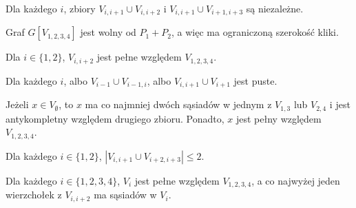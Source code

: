 \documentclass[polish]{beamer}
\begin{document}
\begin{frame}
    \begin{theorem}
        \renewcommand{\qedsymbol}{}
        Dla każdego $i$, zbiory $V_{i,i+1} \cup V_{i,i+2}$ i $V_{i,i+1} \cup V_{i+1,i+3}$ są niezależne.
    \end{theorem}
    \graphSmaller
\end{frame}

\begin{frame}
    \begin{theorem}
        \renewcommand{\qedsymbol}{}
        Graf $G[V_{1,2,3,4}]$ jest wolny od $P_1 + P_2$, a więc ma ograniczoną szerokość kliki.
        \end{theorem}
    \graphSmaller
\end{frame}

\begin{frame}
    \begin{theorem}
        \renewcommand{\qedsymbol}{}
        Dla $i \in \{1,2\}$, $V_{i,i+2}$ jest pełne względem $V_{1,2,3,4}$.
    \end{theorem}
    \graphSmaller
\end{frame}

\begin{frame}
    \begin{theorem}
        \renewcommand{\qedsymbol}{}
        Dla każdego $i$, albo $V_{i-1} \cup V_{i-1,i}$, albo $V_{i,i+1} \cup V_{i+1}$ jest puste.
    \end{theorem}
    \graphSmaller
\end{frame}

\begin{frame}
    \begin{theorem}
        \renewcommand{\qedsymbol}{}
        Jeżeli $x \in V_\emptyset$, to $x$ ma co najmniej dwóch sąsiadów w jednym z $V_{1,3}$ lub $V_{2,4}$ i jest antykompletny względem drugiego zbioru. Ponadto, $x$ jest pełny względem $V_{1,2,3,4}$.
    \end{theorem}
    \graphSmaller
\end{frame}

\begin{frame}
    \begin{theorem}
        \renewcommand{\qedsymbol}{}
        Dla każdego $i \in \{1, 2\}$, $|V_{i,i+1} \cup V_{i+2,i+3}| \leq 2$.
    \end{theorem}
    \graphSmaller
\end{frame}

\begin{frame}
    \begin{theorem}
        \renewcommand{\qedsymbol}{}
        Dla każdego $i \in \{1, 2, 3, 4\}$, $V_i$ jest pełne względem $V_{1,2,3,4}$, a co najwyżej jeden wierzchołek z $V_{i,i+2}$ ma sąsiadów w $V_i$.
    \end{theorem}
    \graphSmaller
\end{frame}
\end{document}
